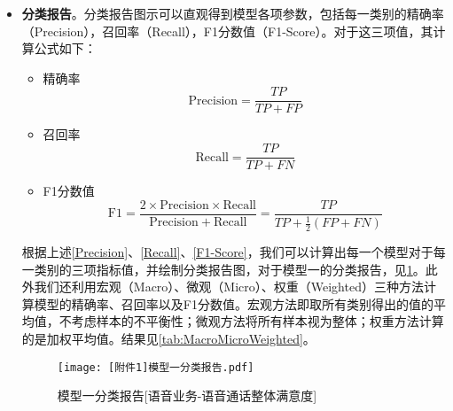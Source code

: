 \documentclass{MathorCupmodeling}
\begin{document}
\begin{itemize}
		\item \textbf{分类报告}。分类报告图示可以直观得到模型各项参数，包括每一类别的精确率（Precision），召回率（Recall），F1分数值（F1-Score）。对于这三项值，其计算公式如下：
		\begin{itemize}
			\item {\heiti 精确率}
			\begin{equation}
				\mathrm{Precision} = \frac{TP}{TP+FP} \label{Precision}
			\end{equation}
			\item {\heiti 召回率}
			\begin{equation}
				\mathrm{Recall} = \frac{TP}{TP+FN} \label{Recall}
			\end{equation}
			\item {\heiti F1分数值} 
			\begin{equation}
				\mathrm{F}1 = \frac{2\times \mathrm{Precision}\times \mathrm{Recall}}{\mathrm{Precision}+\mathrm{Recall}}=\frac{TP}{TP+\frac{1}{2}\left(FP+FN\right)} \label{F1-Score}
			\end{equation}
		\end{itemize}
		根据上述\textcolor{blue}{\eqref{Precision}}、\textcolor{blue}{\eqref{Recall}}、\textcolor{blue}{\eqref{F1-Score}}，我们可以计算出每一个模型对于每一类别的三项指标值，并绘制分类报告图，对于模型一的分类报告，见\textcolor{blue}{\cref{fig:FirstModelClassificationReport}}。此外我们还利用宏观（Macro）、微观（Micro）、权重（Weighted）三种方法计算模型的精确率、召回率以及F1分数值。宏观方法即取所有类别得出的值的平均值，不考虑样本的不平衡性；微观方法将所有样本视为整体；权重方法计算的是加权平均值。结果见\textcolor{blue}{\cref{tab:MacroMicroWeighted}}。
		\begin{figure}[htbp]
			\centerline{\texttt{[image: [附件1]模型一分类报告.pdf]}}
			\caption{模型一分类报告[语音业务-语音通话整体满意度]}\label{fig:FirstModelClassificationReport}
		\end{figure}


\end{itemize}
\end{document}
